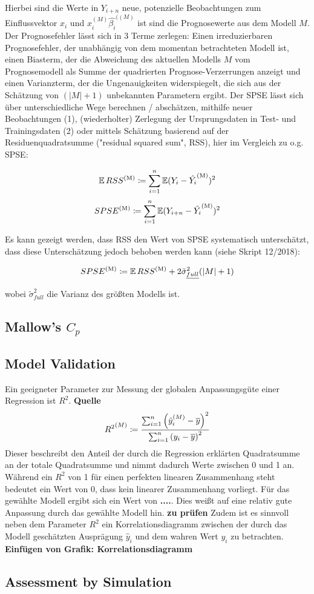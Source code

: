 	Hierbei sind die Werte in $Y_{i+n}$ neue, potenzielle Beobachtungen zum Einflussvektor $x_i$ und $x_{i}^{(M)}\hat{\beta_i}^{((M)}$ ist sind die Prognosewerte aus dem Modell $M$.
	Der Prognosefehler lässt sich in 3 Terme zerlegen: Einen irreduzierbaren Prognosefehler, der unabhängig von dem momentan betrachteten Modell ist, einen Biasterm, der die Abweichung des aktuellen Modells $M$ vom Prognosemodell als Summe der quadrierten Prognose-Verzerrungen anzeigt und einen Varianzterm, der die Ungenauigkeiten widerspiegelt, die sich aus der Schätzung von $(|M|+1)$ unbekannten Parametern ergibt.
	Der SPSE lässt sich über unterschiedliche Wege berechnen / abschätzen, mithilfe neuer Beobachtungen (1), (wiederholter) Zerlegung der Ursprungsdaten in Test- und Trainingsdaten (2) oder mittels Schätzung basierend auf der Residuenquadratsumme ("residual squared sum", RSS), hier im Vergleich zu o.g. SPSE:

	\[
	\operatorname{\mathbb{E}} RSS^{\mathrm{(M)}} \coloneqq \sum_{i=1}^{n} \operatorname{\mathbb{E}} (Y_{i} - \hat{Y_i}^{\mathrm{(M)}})^2
	\]
	\[
	SPSE^{\mathrm{(M)}} \coloneqq \sum_{i=1}^{n} \operatorname{\mathbb{E}} (Y_{i+n} - \hat{Y_i}^{\mathrm{(M)}})^2
	\]

	Es kann gezeigt werden, dass RSS den Wert von SPSE systematisch unterschätzt, dass diese Unterschätzung jedoch behoben werden kann (siehe Skript 12/2018):

    \[
	SPSE^{\mathrm{(M)}} \coloneqq \operatorname{\mathbb{E}} RSS^{\mathrm{(M)}} + 2\tilde{\sigma}_{\underline{full}}^2(|M|+1)
    \]

    wobei $\tilde{\sigma}_{full}^2$ die Varianz des größten Modells ist.


	\subsection{Mallow's $C_{p}$}
	\label{ssec:mallows-C_p}



	\subsection{Model Validation}
	\label{ssec:model-validation}
    Ein geeigneter Parameter zur Messung der globalen Anpassungsgüte einer Regression ist $R^2$. \textbf{Quelle}
    \[
    {R^2}^{(M)} \coloneqq \frac {\sum_{i=1}^n \left( \hat{y}^{(M)}_i - \overline{y} \right)^2}{\sum_{i=1}^n \left( y_i - \overline{y} \right)^2}
    \]
    Dieser beschreibt den Anteil der durch die Regression erklärten Quadratsumme an der totale Quadratsumme und nimmt dadurch Werte zwischen 0 und 1 an.
    Während ein $R^2$ von 1 für einen perfekten linearen Zusammenhang steht bedeutet ein Wert von 0, dass kein linearer Zusammenhang vorliegt.
    Für das gewählte Modell ergibt sich ein Wert von \textbf{....}.
    Dies weißt auf eine relativ gute Anpassung durch das gewählte Modell hin. \textbf{zu prüfen}
    Zudem ist es sinnvoll neben dem Parameter $R^2$ ein Korrelationsdiagramm zwischen der durch das Modell geschätzten Ausprägung $\hat{y}_i$ und dem wahren Wert $y_i$ zu betrachten.
    \textbf{Einfügen von Grafik: Korrelationsdiagramm}
    
    



	\subsection{Assessment by Simulation}
	\label{ssec:simulation}



